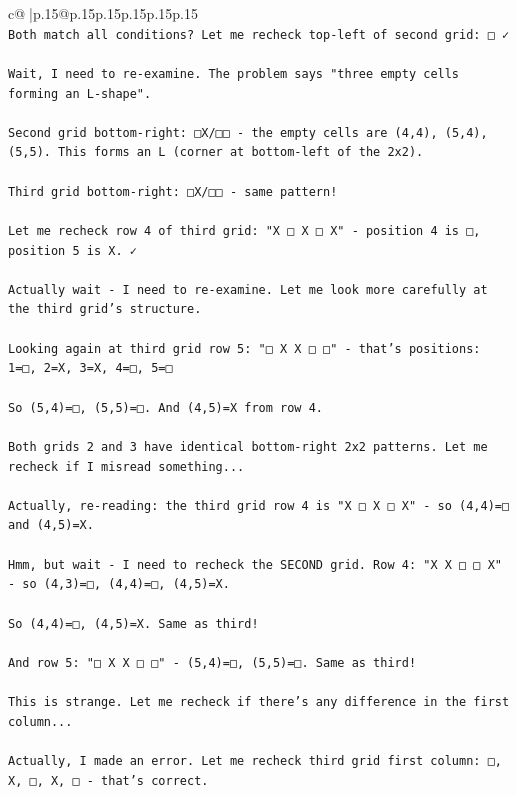 \documentclass{article}
\begin{document}
{\begin{supertabular}{c@{$\;$}|p{.15\linewidth}@{}p{.15\linewidth}p{.15\linewidth}p{.15\linewidth}p{.15\linewidth}p{.15\linewidth}}
{{{\\ 
\texttt{Both match all conditions? Let me recheck top{-}left of second grid: □ ✓} \\
\\ 
\texttt{Wait, I need to re{-}examine. The problem says "three empty cells forming an L{-}shape". } \\
\\ 
\texttt{Second grid bottom{-}right: □X/□□ {-} the empty cells are (4,4), (5,4), (5,5). This forms an L (corner at bottom{-}left of the 2x2).} \\
\\ 
\texttt{Third grid bottom{-}right: □X/□□ {-} same pattern!} \\
\\ 
\texttt{Let me recheck row 4 of third grid: "X □ X □ X" {-} position 4 is □, position 5 is X. ✓} \\
\\ 
\texttt{Actually wait {-} I need to re{-}examine. Let me look more carefully at the third grid's structure.} \\
\\ 
\texttt{Looking again at third grid row 5: "□ X X □ □" {-} that's positions: 1=□, 2=X, 3=X, 4=□, 5=□} \\
\\ 
\texttt{So (5,4)=□, (5,5)=□. And (4,5)=X from row 4.} \\
\\ 
\texttt{Both grids 2 and 3 have identical bottom{-}right 2x2 patterns. Let me recheck if I misread something...} \\
\\ 
\texttt{Actually, re{-}reading: the third grid row 4 is "X □ X □ X" {-} so (4,4)=□ and (4,5)=X.} \\
\\ 
\texttt{Hmm, but wait {-} I need to recheck the SECOND grid. Row 4: "X X □ □ X" {-} so (4,3)=□, (4,4)=□, (4,5)=X.} \\
\\ 
\texttt{So (4,4)=□, (4,5)=X. Same as third!} \\
\\ 
\texttt{And row 5: "□ X X □ □" {-} (5,4)=□, (5,5)=□. Same as third!} \\
\\ 
\texttt{This is strange. Let me recheck if there's any difference in the first column...} \\
\\ 
\texttt{Actually, I made an error. Let me recheck third grid first column: □, X, □, X, □ {-} that's correct.} \\
}}}
\end{supertabular}}
\end{document}
